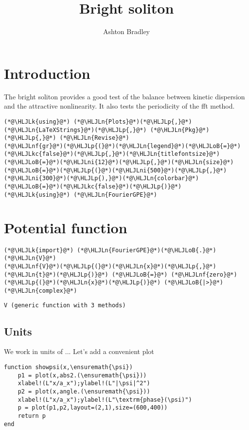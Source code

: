 \documentclass[12pt,a4paper]{article}
\title{ Bright soliton }
\author{ Ashton Bradley }
\newcommand{\HLJLk}[1]{\textcolor[RGB]{148,91,176}{\textbf{#1}}}
\newcommand{\HLJLkc}[1]{\textcolor[RGB]{59,151,46}{\textit{#1}}}
\newcommand{\HLJLn}[1]{#1}
\newcommand{\HLJLnf}[1]{\textcolor[RGB]{66,102,213}{#1}}
\newcommand{\HLJLni}[1]{\textcolor[RGB]{59,151,46}{#1}}
\newcommand{\HLJLoB}[1]{\textcolor[RGB]{102,102,102}{\textbf{#1}}}
\newcommand{\HLJLp}[1]{#1}
\begin{document}
\maketitle

\section{Introduction}
The bright soliton provides a good test of the balance between kinetic dispersion and the attractive nonlinearity. It also tests the periodicity of the fft method. 


\begin{lstlisting}
(*@\HLJLk{using}@*) (*@\HLJLn{Plots}@*)(*@\HLJLp{,}@*) (*@\HLJLn{LaTeXStrings}@*)(*@\HLJLp{,}@*) (*@\HLJLn{Pkg}@*)(*@\HLJLp{,}@*) (*@\HLJLn{Revise}@*)
(*@\HLJLnf{gr}@*)(*@\HLJLp{(}@*)(*@\HLJLn{legend}@*)(*@\HLJLoB{=}@*)(*@\HLJLkc{false}@*)(*@\HLJLp{,}@*)(*@\HLJLn{titlefontsize}@*)(*@\HLJLoB{=}@*)(*@\HLJLni{12}@*)(*@\HLJLp{,}@*)(*@\HLJLn{size}@*)(*@\HLJLoB{=}@*)(*@\HLJLp{(}@*)(*@\HLJLni{500}@*)(*@\HLJLp{,}@*)(*@\HLJLni{300}@*)(*@\HLJLp{),}@*)(*@\HLJLn{colorbar}@*)(*@\HLJLoB{=}@*)(*@\HLJLkc{false}@*)(*@\HLJLp{)}@*)
(*@\HLJLk{using}@*) (*@\HLJLn{FourierGPE}@*)
\end{lstlisting}


\section{Potential function}

\begin{lstlisting}
(*@\HLJLk{import}@*) (*@\HLJLn{FourierGPE}@*)(*@\HLJLoB{.}@*)(*@\HLJLn{V}@*)
(*@\HLJLnf{V}@*)(*@\HLJLp{(}@*)(*@\HLJLn{x}@*)(*@\HLJLp{,}@*)(*@\HLJLn{t}@*)(*@\HLJLp{)}@*) (*@\HLJLoB{=}@*) (*@\HLJLnf{zero}@*)(*@\HLJLp{(}@*)(*@\HLJLn{x}@*)(*@\HLJLp{)}@*) (*@\HLJLoB{|>}@*) (*@\HLJLn{complex}@*)
\end{lstlisting}

\begin{lstlisting}
V (generic function with 3 methods)
\end{lstlisting}


\subsection{Units}
We work in units of ... Let's add a convenient plot

\begin{verbatim}
function showpsi(x,\ensuremath{\psi})
    p1 = plot(x,abs2.(\ensuremath{\psi}))
    xlabel!(L"x/a_x");ylabel!(L"|\psi|^2")
    p2 = plot(x,angle.(\ensuremath{\psi}))
    xlabel!(L"x/a_x");ylabel!(L"\textrm{phase}(\psi)")
    p = plot(p1,p2,layout=(2,1),size=(600,400))
    return p
end
\end{verbatim}
\end{document}
